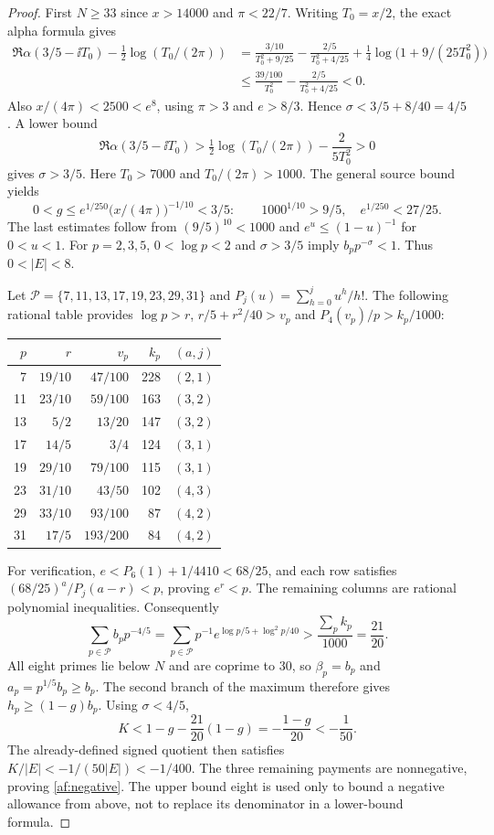 \begin{proof}
First $N\ge33$ since $x>14000$ and $\pi<22/7$.
Writing $T_0=x/2$, the exact alpha formula gives
\begin{align*}
 \Re\alpha(3/5-\ii T_0)-\tfrac12\log(T_0/(2\pi))
 &=\frac{3/10}{T_0^2+9/25}-\frac{2/5}{T_0^2+4/25}
      +\tfrac14\log\bigl(1+9/(25T_0^2)\bigr)\\
 &\le\frac{39/100}{T_0^2}-\frac{2/5}{T_0^2+4/25}<0.
\end{align*}
Also $x/(4\pi)<2500<e^8$, using $\pi>3$ and $e>8/3$.
Hence $\sigma<3/5+8/40=4/5$. A lower bound
\[
 \Re\alpha(3/5-\ii T_0)>
 \tfrac12\log(T_0/(2\pi))-\frac{2}{5T_0^2}>0
\]
gives $\sigma>3/5$. Here $T_0>7000$ and $T_0/(2\pi)>1000$.
The general source bound \cite[(20)]{Polymath2019} yields
\[
 0<g\le e^{1/250}\bigl(x/(4\pi)\bigr)^{-1/10}<3/5:
 \qquad 1000^{1/10}>9/5,\quad e^{1/250}<27/25.
\]
The last estimates follow from $(9/5)^{10}<1000$ and
$e^u\le(1-u)^{-1}$ for $0<u<1$. For $p=2,3,5$,
$0<\log p<2$ and $\sigma>3/5$ imply
$b_p p^{-\sigma}<1$. Thus $0<|E|<8$.

Let $\mathcal P=\{7,11,13,17,19,23,29,31\}$ and
$P_j(u)=\sum_{h=0}^j u^h/h!$. The following rational table provides
$\log p>r$, $r/5+r^2/40>v_p$ and $P_4(v_p)/p>k_p/1000$:
\begin{center}
\begin{tabular}{rrrrr}
\toprule
$p$&$r$&$v_p$&$k_p$&$(a,j)$\\
\midrule
7&$19/10$&$47/100$&228&$(2,1)$\\
11&$23/10$&$59/100$&163&$(3,2)$\\
13&$5/2$&$13/20$&147&$(3,2)$\\
17&$14/5$&$3/4$&124&$(3,1)$\\
19&$29/10$&$79/100$&115&$(3,1)$\\
23&$31/10$&$43/50$&102&$(4,3)$\\
29&$33/10$&$93/100$&87&$(4,2)$\\
31&$17/5$&$193/200$&84&$(4,2)$\\
\bottomrule
\end{tabular}
\end{center}
For verification, $e<P_6(1)+1/4410<68/25$, and each row satisfies
$(68/25)^a/P_j(a-r)<p$, proving $e^r<p$.
The remaining columns are rational polynomial inequalities.
Consequently
\begin{equation}
 \sum_{p\in\mathcal P} b_p p^{-4/5}
 =\sum_{p\in\mathcal P}p^{-1}
       e^{\log p/5+\log^2p/40}
 >\frac{\sum_p k_p}{1000}=\frac{21}{20}.
 \label{af:prime-mass}
\end{equation}
All eight primes lie below $N$ and are coprime to 30, so
$\beta_p=b_p$ and $a_p=p^{1/5}b_p\ge b_p$. The second branch of the
maximum therefore gives $h_p\ge(1-g)b_p$. Using $\sigma<4/5$,
\[
 K<1-g-\frac{21}{20}(1-g)
   =-\frac{1-g}{20}<-\frac1{50}.
\]
The already-defined signed quotient then satisfies
$K/|E|<-1/(50|E|)<-1/400$. The three remaining payments are
nonnegative, proving \eqref{af:negative}. The upper bound eight is
used only to bound a negative allowance from above, not to replace
its denominator in a lower-bound formula.
\end{proof}

